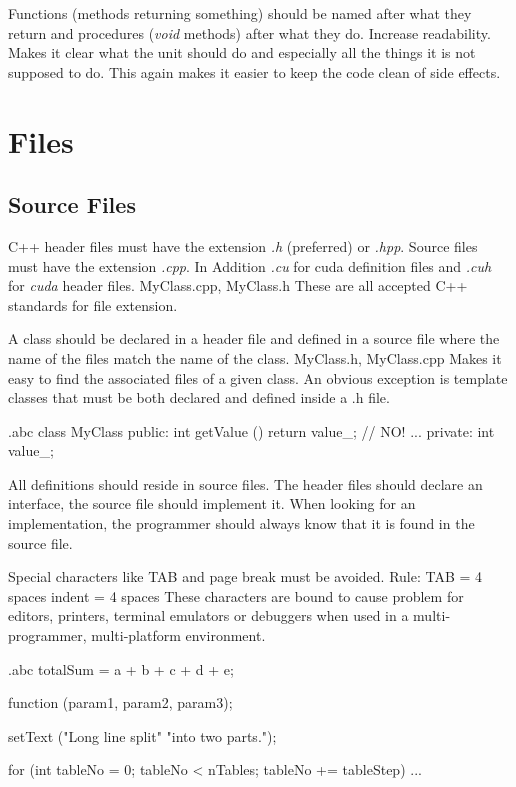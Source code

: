 \recommendation
{Functions (methods returning something) should be named after what they return and procedures (\textit{void} methods) after what they do.}
{}
{Increase readability. Makes it clear what the unit should do and especially all the things it is not supposed to do. This again makes it easier to keep the code clean of side effects.}

\section{Files}
\subsection{Source Files}

\recommendation
{C++ header files must have the extension \textit{.h} (preferred) or \textit{.hpp}. Source files must have the extension \textit{.cpp}. In Addition \textit{.cu} for cuda definition files and \textit{.cuh} for \textit{cuda} header files.}
{MyClass.cpp, MyClass.h}
{These are all accepted C++ standards for file extension.}

\recommendation
{A class should be declared in a header file and defined in a source file where the name of the files match the name of the class.}
{MyClass.h, MyClass.cpp}
{Makes it easy to find the associated files of a given class. An obvious exception is template classes that must be both declared and defined inside a .h file.}


\begin{filecontents*}{\jobname.abc}
	class MyClass
	{
		public:
		int getValue () {return value_;}  // NO!
		...
		private:
		int value_;
	}
\end{filecontents*}

\recommendation
{All definitions should reside in source files.}
{}
{The header files should declare an interface, the source file should implement it. When looking for an implementation, the programmer should always know that it is found in the source file.}

\recommendation
{
	Special characters like TAB and page break must be avoided.\newline
	Rule: TAB = 4 spaces\newline
	indent = 4 spaces
}
{}
{These characters are bound to cause problem for editors, printers, terminal emulators or debuggers when used in a multi-programmer, multi-platform environment.}


\begin{filecontents*}{\jobname.abc}
	totalSum = a + b + c +
	d + e;
	
	function (param1, param2,
	param3);
	
	setText ("Long line split"
	"into two parts.");
	
	for (int tableNo = 0; tableNo < nTables;
	tableNo += tableStep) {
		...
	}
\end{filecontents*}

